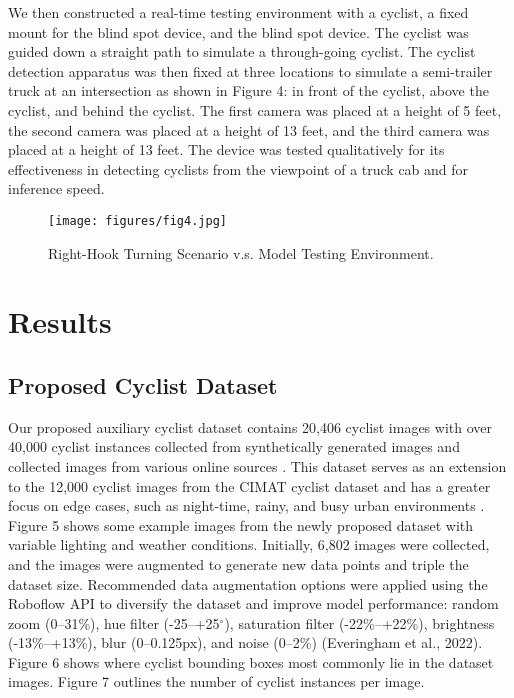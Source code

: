 \documentclass{article}
\begin{document}
We then constructed a real-time testing environment with a cyclist, a fixed mount for the blind spot device, and the blind spot device. The cyclist was guided down a straight path to simulate a through-going cyclist. The cyclist detection apparatus was then fixed at three locations to simulate a semi-trailer truck at an intersection as shown in Figure 4: in front of the cyclist, above the cyclist, and behind the cyclist. The first camera was placed at a height of 5 feet, the second camera was placed at a height of 13 feet, and the third camera was placed at a height of 13 feet. The device was tested qualitatively for its effectiveness in detecting cyclists from the viewpoint of a truck cab and for inference speed. 

\begin{figure}[t]
\centering
\texttt{[image: figures/fig4.jpg]}
\caption{Right-Hook Turning Scenario v.s. Model Testing Environment.}
\label{fig:fig4}
\end{figure}

\section{Results}
\subsection{Proposed Cyclist Dataset}
Our proposed auxiliary cyclist dataset contains 20,406 cyclist images with over 40,000 cyclist instances collected from synthetically generated images and collected images from various online sources \cite{thomas_open_2021}. This dataset serves as an extension to the 12,000 cyclist images from the CIMAT cyclist dataset and has a greater focus on edge cases, such as night-time, rainy, and busy urban environments \cite{thomas_open_2021}. Figure 5 shows some example images from the newly proposed dataset with variable lighting and weather conditions. Initially, 6,802 images were collected, and the images were augmented to generate new data points and triple the dataset size. Recommended data augmentation options were applied using the Roboflow API to diversify the dataset and improve model performance: random zoom (0–31\%), hue filter (-25–+25$^{\circ}$), saturation filter (-22\%–+22\%), brightness (-13\%–+13\%), blur (0–0.125px), and noise (0–2\%) (Everingham et al., 2022). Figure 6 shows where cyclist bounding boxes most commonly lie in the dataset images. Figure 7 outlines the number of cyclist instances per image. 
\end{document}
